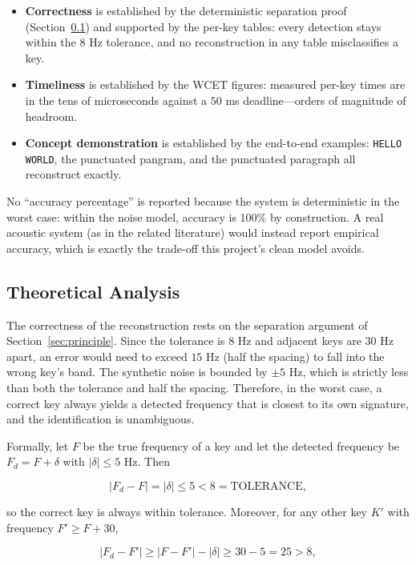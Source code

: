 \documentclass[11pt,a4paper]{article}
\newcommand{\Key}[1]{\texttt{#1}}
\begin{document}
\begin{itemize}
    \item \textbf{Correctness} is established by the deterministic separation
          proof (Section~\ref{sec:theory}) and supported by the per-key
          tables: every detection stays within the $8$ Hz tolerance, and no
          reconstruction in any table misclassifies a key.
    \item \textbf{Timeliness} is established by the WCET figures: measured
          per-key times are in the tens of microseconds against a $50$ ms
          deadline---orders of magnitude of headroom.
    \item \textbf{Concept demonstration} is established by the end-to-end
          examples: \Key{HELLO WORLD}, the punctuated pangram, and the punctuated
          paragraph all reconstruct exactly.
\end{itemize}

No ``accuracy percentage'' is reported because the system is deterministic in
the worst case: within the noise model, accuracy is 100\% by construction. A
real acoustic system (as in the related literature) would instead report
empirical accuracy, which is exactly the trade-off this project's clean model
avoids.

\subsection{Theoretical Analysis}
\label{sec:theory}

The correctness of the reconstruction rests on the separation argument of
Section~\ref{sec:principle}. Since the tolerance is $8$ Hz and adjacent keys
are $30$ Hz apart, an error would need to exceed $15$ Hz (half the spacing) to
fall into the wrong key's band. The synthetic noise is bounded by $\pm 5$ Hz,
which is strictly less than both the tolerance and half the spacing. Therefore,
in the worst case, a correct key always yields a detected frequency that is
closest to its own signature, and the identification is unambiguous.

Formally, let $F$ be the true frequency of a key and let the detected frequency
be $F_d = F + \delta$ with $|\delta| \le 5$ Hz. Then

\[
|F_d - F| = |\delta| \le 5 < 8 = \text{TOLERANCE},
\]

so the correct key is always within tolerance. Moreover, for any other key $K'$
with frequency $F' \ge F + 30$,

\[
|F_d - F'| \ge |F - F'| - |\delta| \ge 30 - 5 = 25 > 8,
\]
\end{document}

